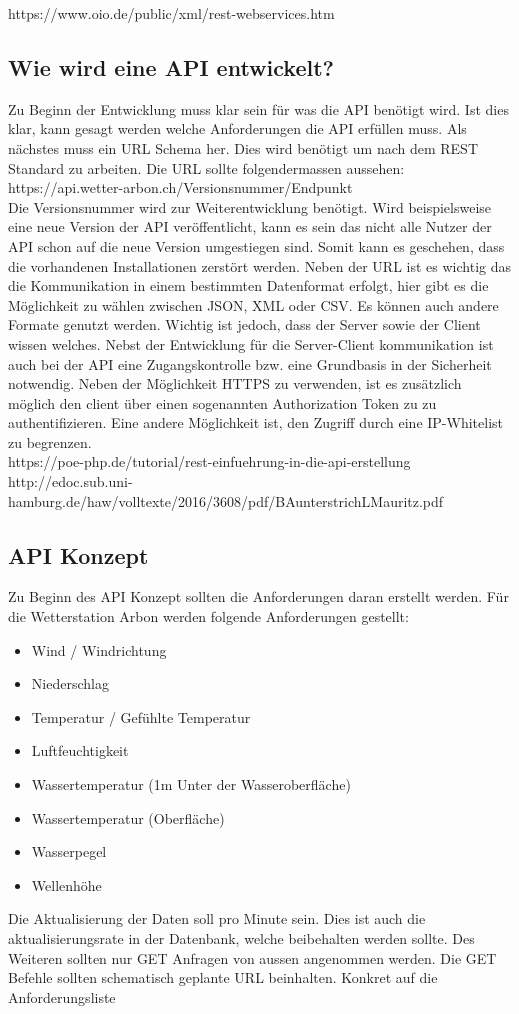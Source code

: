 https://www.oio.de/public/xml/rest-webservices.htm

\subsection{Wie wird eine API entwickelt?}
Zu Beginn der Entwicklung muss klar sein für was die API benötigt wird. Ist dies klar, kann gesagt werden welche Anforderungen die API erfüllen muss. Als nächstes muss ein URL Schema her. Dies wird benötigt um nach dem REST Standard zu arbeiten. Die URL sollte folgendermassen aussehen: \\ https://api.wetter-arbon.ch/Versionsnummer/Endpunkt\\
Die Versionsnummer wird zur Weiterentwicklung benötigt. Wird beispielsweise eine neue Version der API veröffentlicht, kann es sein das nicht alle Nutzer der API schon auf die neue Version umgestiegen sind. Somit kann es geschehen, dass die vorhandenen Installationen zerstört werden. Neben der URL ist es wichtig das die Kommunikation in einem bestimmten Datenformat erfolgt, hier gibt es die Möglichkeit zu wählen zwischen JSON, XML oder CSV. Es können auch andere Formate genutzt werden. Wichtig ist jedoch, dass der Server sowie der Client wissen welches. Nebst der Entwicklung für die Server-Client kommunikation ist auch bei der API eine Zugangskontrolle bzw. eine Grundbasis in der Sicherheit notwendig. Neben der Möglichkeit HTTPS zu verwenden, ist es zusätzlich möglich den client über einen sogenannten Authorization Token zu zu authentifizieren. Eine andere Möglichkeit ist, den Zugriff durch eine IP-Whitelist zu begrenzen. \\

https://poe-php.de/tutorial/rest-einfuehrung-in-die-api-erstellung\\
http://edoc.sub.uni-hamburg.de/haw/volltexte/2016/3608/pdf/BAunterstrichLMauritz.pdf\\

\subsection{API Konzept}

Zu Beginn des API Konzept sollten die Anforderungen daran erstellt werden. Für die Wetterstation Arbon werden folgende Anforderungen gestellt:
\begin{itemize}
\item Wind / Windrichtung
\item Niederschlag
\item Temperatur / Gefühlte Temperatur
\item Luftfeuchtigkeit
\item Wassertemperatur (1m Unter der Wasseroberfläche)
\item Wassertemperatur (Oberfläche)
\item Wasserpegel
\item Wellenhöhe
\end{itemize}
Die Aktualisierung der Daten soll pro Minute sein. Dies ist auch die aktualisierungsrate in der Datenbank, welche beibehalten werden sollte. Des Weiteren sollten nur GET Anfragen von aussen angenommen werden. Die GET Befehle sollten schematisch geplante URL beinhalten. Konkret auf die Anforderungsliste 

